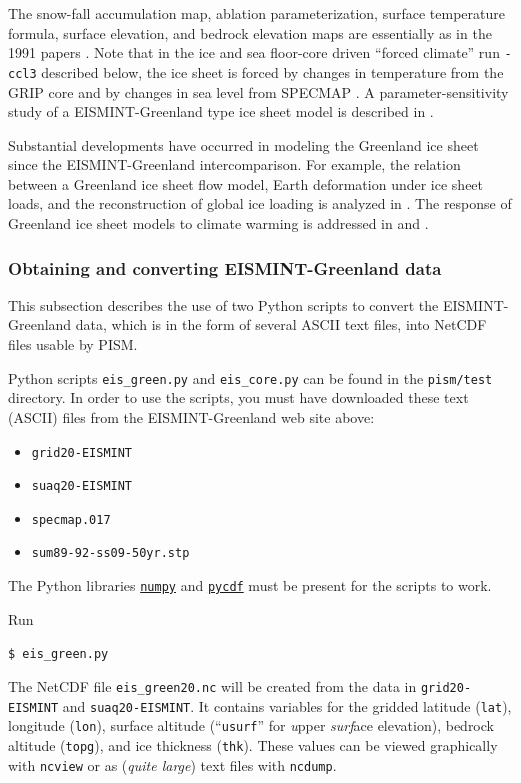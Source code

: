 \documentclass[11pt,final]{amsart}
\begin{document}
\noindent The snow-fall accumulation map, ablation parameterization, surface temperature formula, surface elevation, and bedrock elevation maps are essentially as in the 1991 papers \cite{Letreguillyetal1991,OhmuraReeh}.  Note that in the ice and sea floor-core driven ``forced climate'' run \verb|-ccl3| described below, the ice sheet is forced by changes in temperature from the GRIP core \cite{Dansgaardetal1993} and by changes in sea level from SPECMAP \cite{Imbrieetal1984}.  A parameter-sensitivity study of a EISMINT-Greenland type ice sheet model is described in \cite{RitzFabreLetreguilly}.

Substantial developments have occurred in modeling the Greenland ice sheet since the EISMINT-Greenland intercomparison.  For example, the relation between a Greenland ice sheet flow model, Earth deformation under ice sheet loads, and the reconstruction of global ice loading is analyzed in \cite{TarasovPeltier}.  The response of Greenland ice sheet models to climate warming is addressed in \cite{HuybrechtsdeWolde} and \cite{Greve00}.


\subsubsection*{Obtaining and converting EISMINT-Greenland data}  This subsection describes the use of two Python scripts to convert the EISMINT-Greenland data, which is in the form of several ASCII text files, into NetCDF files usable by PISM.

Python scripts \verb|eis_green.py| and \verb|eis_core.py| can be found in the \verb|pism/test| directory.  In order to use the scripts, you must have downloaded these text (ASCII) files from the EISMINT-Greenland web site above:\begin{itemize}
 \item \verb|grid20-EISMINT|
 \item \verb|suaq20-EISMINT|
 \item \verb|specmap.017|
 \item \verb|sum89-92-ss09-50yr.stp|
\end{itemize}
The Python libraries \href{http://numpy.scipy.org/}{\texttt{numpy}} and \href{http://pysclint.sourceforge.net/pycdf/}{\texttt{pycdf}} must be present for the scripts to work.

Run

\verb|$ eis_green.py|

The NetCDF file \verb|eis_green20.nc| will be created from the data in \verb|grid20-EISMINT| and \verb|suaq20-EISMINT|.  It contains variables for the gridded latitude (\verb|lat|), longitude (\verb|lon|), surface altitude (``\verb|usurf|'' for \emph{u}pper \emph{surf}ace elevation), bedrock altitude (\verb|topg|), and ice thickness (\verb|thk|).  These values can be viewed graphically with \verb|ncview| or as (\emph{quite large}) text files with \verb|ncdump|.
\end{document}
